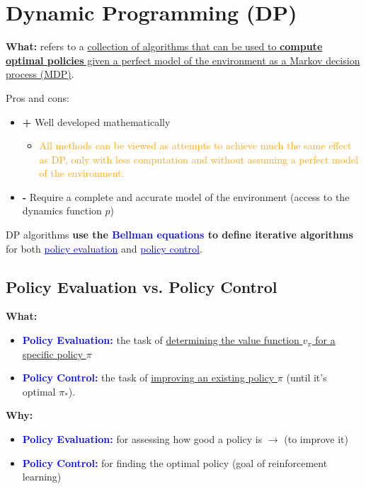 \documentclass[12pt, a4paper]{article}
\let\stdsection\section
\renewcommand\section{\newpage\stdsection} %
\begin{document}
\section{Dynamic Programming (DP)}\label{dynamic-programming}


\textbf{What:} refers to a \uline{collection of algorithms that can be used to }\textbf{\uline{compute optimal policies}}\uline{ given a perfect model of the environment as a Markov decision process (MDP)}.


Pros and cons:

\begin{itemize}
  \item \textbf{+} Well developed mathematically
  \begin{itemize}
    \item \textcolor{orange}{All methods can be viewed as attempts to achieve much the same effect as DP, only with less computation and without assuming a perfect model of the environment.}
  \end{itemize}
  \item \textbf{-} Require a complete and accurate model of the environment (access to the dynamics function $p$)
\end{itemize}


DP algorithms \textbf{use the \textcolor{blue}{Bellman equations} to define iterative algorithms} for both \textcolor{blue}{\uline{policy evaluation}} and \textcolor{blue}{\uline{policy control}}.




\subsection{Policy Evaluation vs. Policy Control}\label{policy-evaluation-vs-policy-control}

\textbf{What:}
\begin{itemize}
  \item \textbf{\textcolor{blue}{Policy Evaluation:}} the task of \uline{determining the value function $v_\pi$ for a specific policy $\pi$}
  \item \textbf{\textcolor{blue}{Policy Control:}} the task of \uline{improving an existing policy $\pi$} (until it's optimal $\pi_*$).
\end{itemize}

\textbf{Why:}
\begin{itemize}
  \item \textbf{\textcolor{blue}{Policy Evaluation:}} for assessing how good a policy is $\rightarrow$ (to improve it)
  \item \textbf{\textcolor{blue}{Policy Control:}} for finding the optimal policy (goal of reinforcement learning)
\end{itemize}
\end{document}
